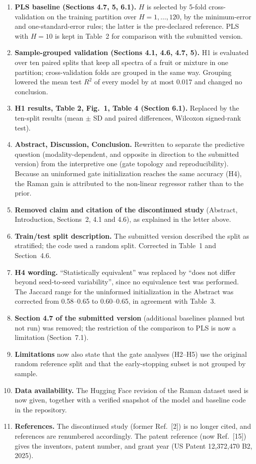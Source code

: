 \documentclass[11pt]{article}
\begin{document}
\begin{enumerate}
\item \textbf{PLS baseline (Sections 4.7, 5, 6.1).} $H$ is selected by 5-fold cross-validation on the training partition over $H=1,\dots,120$, by the minimum-error and one-standard-error rules; the latter is the pre-declared reference. PLS with $H=10$ is kept in Table~2 for comparison with the submitted version.
\item \textbf{Sample-grouped validation (Sections 4.1, 4.6, 4.7, 5).} H1 is evaluated over ten paired splits that keep all spectra of a fruit or mixture in one partition; cross-validation folds are grouped in the same way. Grouping lowered the mean test $R^{2}$ of every model by at most 0.017 and changed no conclusion.
\item \textbf{H1 results, Table 2, Fig.~1, Table 4 (Section 6.1).} Replaced by the ten-split results (mean $\pm$ SD and paired differences, Wilcoxon signed-rank test).
\item \textbf{Abstract, Discussion, Conclusion.} Rewritten to separate the predictive question (modality-dependent, and opposite in direction to the submitted version) from the interpretive one (gate topology and reproducibility). Because an uninformed gate initialization reaches the same accuracy (H4), the Raman gain is attributed to the non-linear regressor rather than to the prior.
\item \textbf{Removed claim and citation of the discontinued study} (Abstract, Introduction, Sections~2, 4.1 and 4.6), as explained in the letter above.
\item \textbf{Train/test split description.} The submitted version described the split as stratified; the code used a random split. Corrected in Table~1 and Section~4.6.
\item \textbf{H4 wording.} ``Statistically equivalent'' was replaced by ``does not differ beyond seed-to-seed variability'', since no equivalence test was performed. The Jaccard range for the uninformed initialization in the Abstract was corrected from 0.58--0.65 to 0.60--0.65, in agreement with Table~3.
\item \textbf{Section 4.7 of the submitted version} (additional baselines planned but not run) was removed; the restriction of the comparison to PLS is now a limitation (Section~7.1).
\item \textbf{Limitations} now also state that the gate analyses (H2--H5) use the original random reference split and that the early-stopping subset is not grouped by sample.
\item \textbf{Data availability.} The Hugging Face revision of the Raman dataset used is now given, together with a verified snapshot of the model and baseline code in the repository.
\item \textbf{References.} The discontinued study (former Ref.~[2]) is no longer cited, and references are renumbered accordingly. The patent reference (now Ref.~[15]) gives the inventors, patent number, and grant year (US Patent 12,372,470 B2, 2025).
\end{enumerate}
\end{document}
